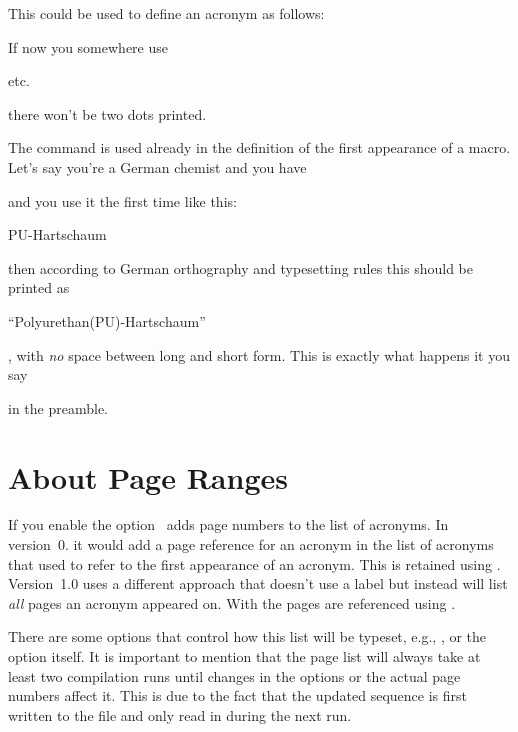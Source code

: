 \documentclass{acro-manual}
\begin{document}
This could be used to define an acronym as follows:
\begin{sourcecode}
\end{sourcecode}
If now you somewhere use
\begin{sourcecode}
  \ac{etc}.
\end{sourcecode}
there won't be two dots printed.

The command  is used already in the definition of the first
appearance of a macro.  Let's say you're a German chemist and you have
\begin{sourcecode}
\end{sourcecode}
and you use it the first time like this:
\begin{sourcecode}
  \ac{PU}-Hartschaum
\end{sourcecode}
then according to German orthography and typesetting rules this should be
printed as
\begin{center}
  \enquote{Polyurethan(PU)-Hartschaum}
\end{center}
\ie, with \emph{no} space between long and short form.  This is exactly what
happens it you say
\begin{sourcecode}
\end{sourcecode}
in the preamble.

\section{About Page Ranges}
If you enable the  option \acro\ adds page numbers to the list
of acronyms.  In version~0.\versionstar{} it would add a page reference for an
acronym in the list of acronyms that used  to refer to the first
appearance of an acronym.  This is retained using .
Version~1.0 uses a different approach that doesn't use a label but instead
will list \emph{all} pages an acronym appeared on.  With  the
pages are referenced using .

There are some options that control how this list will be typeset, e.g.,
,  or the option 
itself.  It is important to mention that the page list will always take at
least two compilation runs until changes in the options or the actual page
numbers affect it.  This is due to the fact that the updated sequence is first
written to the  file and only read in during the next run.
\end{document}
